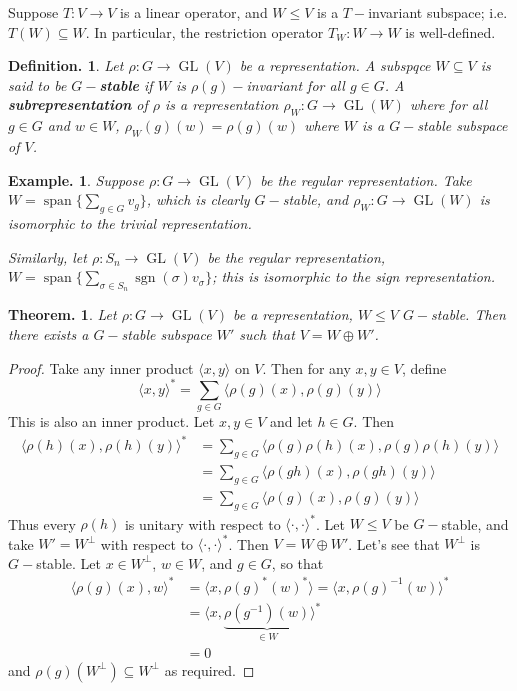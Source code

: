 \documentclass[11pt, a4paper]{memoir}
\newcommand{\mbf}[1]{{\boldmath\bfseries #1}}
\theoremstyle{change}
\newtheorem{theorem}{Theorem.}[section]
\theoremstyle{plain}
\theoremstyle{nonumberplain}
\newtheorem{definition}{Definition.}
\newtheorem{example}{Example.}
\newtheorem{proof}{Proof}
\DeclareMathOperator{\GL}{GL}
\DeclareMathOperator{\spn}{span}
\DeclareMathOperator{\sgn}{sgn}
\numberwithin{equation}{section}
\begin{document}
Suppose $T:V\to V$ is a linear operator, and $W\leq V$ is a $T-$invariant subspace; i.e. $T(W)\subseteq W$.
In particular, the restriction operator $T_W:W\to W$ is well-defined.
\begin{definition}
    Let $\rho:G\to\GL(V)$ be a representation.
    A subspqce $W\subseteq V$ is said to be \mbf{$G-$stable} if $W$ is $\rho(g)-$invariant for all $g\in G$.
    A \textbf{subrepresentation} of $\rho$ is a representation $\rho_W:G\to\GL(W)$ where for all $g\in G$ and $w\in W$, $\rho_W(g)(w)=\rho(g)(w)$ where $W$ is a $G-$stable subspace of $V$.
\end{definition}
\begin{example}
    Suppose $\rho:G\to\GL(V)$ be the regular representation.
    Take $W=\spn\{\sum_{g\in G}v_g\}$, which is clearly $G-$stable, and $\rho_W:G\to\GL(W)$ is isomorphic to the trivial representation.

    Similarly, let $\rho:S_n\to\GL(V)$ be the regular representation, $W=\spn\{\sum_{\sigma\in S_n}\sgn(\sigma)v_\sigma\}$; this is isomorphic to the sign representation.
\end{example}
\begin{theorem}
    Let $\rho:G\to\GL(V)$ be a representation, $W\leq V$ $G-$stable.
    Then there exists a $G-$stable subspace $W'$ such that $V=W\oplus W'$.
\end{theorem}
\begin{proof}
    Take any inner product $\langle x,y\rangle$ on $V$.
    Then for any $x,y\in V$, define
    \begin{equation*}
        \langle x,y\rangle^*=\sum_{g\in G}\langle \rho(g)(x),\rho(g)(y)\rangle
    \end{equation*}
    This is also an inner product.
    Let $x,y\in V$ and let $h\in G$.
    Then
    \begin{align*}
        \langle\rho(h)(x),\rho(h)(y)\rangle^* &= \sum_{g\in G}\langle\rho(g)\rho(h)(x),\rho(g)\rho(h)(y)\rangle\\
                                              &= \sum_{g\in G}\langle\rho(gh)(x),\rho(gh)(y)\rangle\\
                                              &= \sum_{g\in G}\langle\rho(g)(x),\rho(g)(y)\rangle
    \end{align*}
    Thus every $\rho(h)$ is unitary with respect to $\langle\cdot,\cdot\rangle^*$.
    Let $W\leq V$ be $G-$stable, and take $W'=W^\perp$ with respect to $\langle\cdot,\cdot\rangle^*$.
    Then $V=W\oplus W'$.
    Let's see that $W^\perp$ is $G-$stable.
    Let $x\in W^\perp$, $w\in W$, and $g\in G$, so that
    \begin{align*}
        \langle\rho(g)(x),w\rangle^*&=\langle x,\rho(g)^*(w)^*\rangle=\langle x,\rho(g)^{-1}(w)\rangle^*\\
                                    &=\langle x,\underbrace{\rho(g^{-1})(w)}_{\in W}\rangle^*\\
                                    &= 0
    \end{align*}
    and $\rho(g)(W^\perp)\subseteq W^\perp$ as required.
\end{proof}
\end{document}
